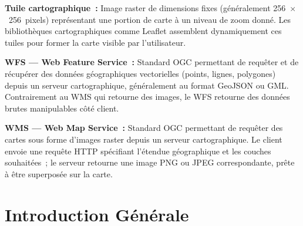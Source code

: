 \documentclass[12pt, a4paper]{report}
\begin{document}
\medskip
\noindent\textbf{Tuile cartographique~:}
Image raster de dimensions fixes (généralement 256~$\times$~256~pixels)
représentant une portion de carte à un niveau de zoom donné. Les bibliothèques
cartographiques comme Leaflet assemblent dynamiquement ces tuiles pour former la
carte visible par l'utilisateur.

\medskip
\noindent\textbf{WFS --- Web Feature Service~:}
Standard OGC permettant de requêter et de récupérer des données géographiques
vectorielles (points, lignes, polygones) depuis un serveur cartographique,
généralement au format GeoJSON ou GML. Contrairement au WMS qui retourne des
images, le WFS retourne des données brutes manipulables côté client.

\medskip
\noindent\textbf{WMS --- Web Map Service~:}
Standard OGC permettant de requêter des cartes sous forme d'images raster depuis
un serveur cartographique. Le client envoie une requête HTTP spécifiant l'étendue
géographique et les couches souhaitées~; le serveur retourne une image PNG ou
JPEG correspondante, prête à être superposée sur la carte.

\clearpage

\dominitoc
\tableofcontents
\clearpage

\listoffigures
{}
\clearpage

\listoftables
{}
\clearpage

\setcounter{page}{1}

\chapter*{Introduction Générale}
\end{document}
